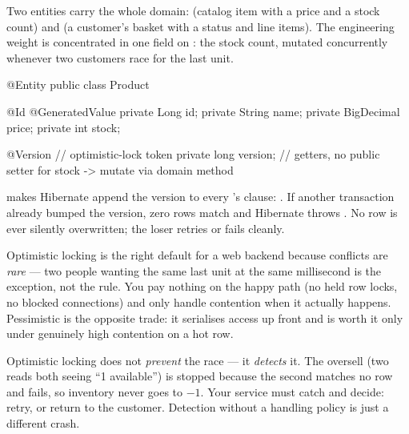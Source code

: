  Two entities carry the whole domain:  (catalog item with a price and a stock count) and  (a customer's basket with a status and line items). The engineering weight is concentrated in one field on : the stock count, mutated concurrently whenever two customers race for the last unit.

\begin{javabox}
@Entity
public class Product {
  @Id @GeneratedValue
  private Long id;
  private String name;
  private BigDecimal price;
  private int stock;

  @Version              // optimistic-lock token
  private long version;
  // getters, no public setter for stock -> mutate via domain method
}
\end{javabox}

  makes Hibernate append the version to every 's  clause: . If another transaction already bumped the version, zero rows match and Hibernate throws . No row is ever silently overwritten; the loser retries or fails cleanly.

\begin{dbinsight}
Optimistic locking is the right default for a web backend because conflicts are \emph{rare} --- two people wanting the same last unit at the same millisecond is the exception, not the rule. You pay nothing on the happy path (no held row locks, no blocked connections) and only handle contention when it actually happens. Pessimistic  is the opposite trade: it serialises access up front and is worth it only under genuinely high contention on a hot row.
\end{dbinsight}

\begin{misconception}
Optimistic locking does not \emph{prevent} the race --- it \emph{detects} it. The oversell (two reads both seeing ``1 available'') is stopped because the second  matches no row and fails, so inventory never goes to $-1$. Your service must catch  and decide: retry, or return  to the customer. Detection without a handling policy is just a different crash.
\end{misconception}


